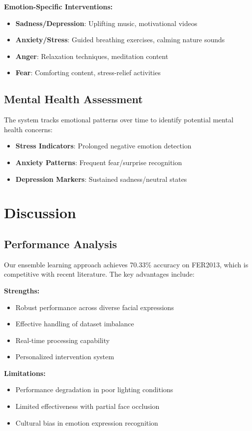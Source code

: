 \textbf{Emotion-Specific Interventions:}
\begin{itemize}
    \item \textbf{Sadness/Depression}: Uplifting music, motivational videos
    \item \textbf{Anxiety/Stress}: Guided breathing exercises, calming nature sounds
    \item \textbf{Anger}: Relaxation techniques, meditation content
    \item \textbf{Fear}: Comforting content, stress-relief activities
\end{itemize}

\subsection{Mental Health Assessment}
The system tracks emotional patterns over time to identify potential mental health concerns:
\begin{itemize}
    \item \textbf{Stress Indicators}: Prolonged negative emotion detection
    \item \textbf{Anxiety Patterns}: Frequent fear/surprise recognition
    \item \textbf{Depression Markers}: Sustained sadness/neutral states
\end{itemize}

\section{Discussion}

\subsection{Performance Analysis}
Our ensemble learning approach achieves 70.33\% accuracy on FER2013, which is competitive with recent literature. The key advantages include:

\textbf{Strengths:}
\begin{itemize}
    \item Robust performance across diverse facial expressions
    \item Effective handling of dataset imbalance
    \item Real-time processing capability
    \item Personalized intervention system
\end{itemize}

\textbf{Limitations:}
\begin{itemize}
    \item Performance degradation in poor lighting conditions
    \item Limited effectiveness with partial face occlusion
    \item Cultural bias in emotion expression recognition
\end{itemize}

